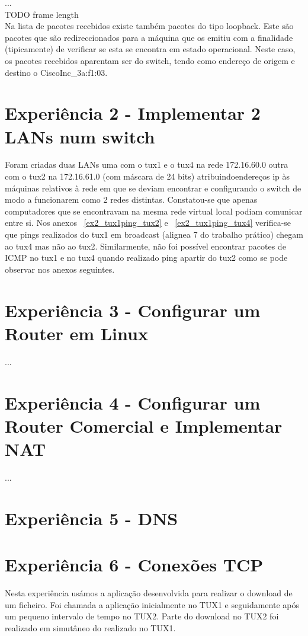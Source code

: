 \documentclass[11pt,a4paper,reqno]{report}
\numberwithin{equation}{section}
\begin{document}
...\\ TODO frame length \\

Na lista de pacotes recebidos existe também pacotes do tipo loopback. Este são pacotes que são redireccionados para a máquina que os emitiu com a finalidade (tipicamente) de verificar se esta se encontra em estado operacional. Neste caso, os pacotes recebidos aparentam ser do switch, tendo como endereço de origem e destino o CiscoInc\_3a:f1:03.

\section{Experiência 2 - Implementar 2 LANs num switch}

Foram criadas duas LANs uma com o tux1 e o tux4 na rede 172.16.60.0 outra com o tux2 na 172.16.61.0 (com máscara de 24 bits) atribuindoendereços  ip às máquinas relativos à rede em que se deviam encontrar e configurando o switch de modo a funcionarem como 2 redes distintas. Constatou-se que apenas  computadores que se encontravam na mesma rede virtual local podiam comunicar entre si. Nos anexos ~\ref{ex2_tux1ping_tux2} e ~\ref{ex2_tux1ping_tux4} verifica-se que pings realizados do tux1 em broadcast (alignea 7 do trabalho prático) chegam ao tux4 mas não ao tux2. Similarmente, não foi possível encontrar pacotes de ICMP no tux1 e no tux4 quando realizado ping apartir do tux2 como se pode observar nos anexos seguintes.


\section{Experiência 3 - Configurar um Router em Linux}
...
\section{Experiência 4 - Configurar um Router Comercial e Implementar NAT}
...
\section{Experiência 5 - DNS}

\section{Experiência 6 - Conexões TCP}

Nesta experiência usámos a aplicação desenvolvida para realizar o download de um ficheiro. Foi chamada a aplicação inicialmente no TUX1 e seguidamente após um pequeno intervalo de tempo no TUX2. Parte do download no TUX2 foi realizado em simutâneo do realizado no TUX1.\\
\end{document}
